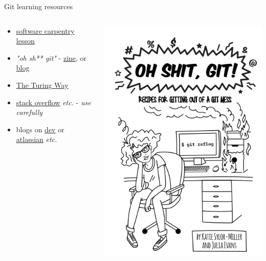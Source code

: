 \documentclass{beamer} %
\begin{document}
  \begin{frame}{Git learning resources}
    \begin{columns}
      \begin{column}{0.5\textwidth}
        \begin{itemize}
          \item \href{http://swcarpentry.github.io/git-novice/}{\underline{software carpentry lesson}}
          \item \textit{"oh sh** git"} - \href{https://wizardzines.com/zines/oh-shit-git/}{\underline{zine}}, or \href{https://ohshitgit.com/}{\underline{blog}}
          \item \href{https://the-turing-way.netlify.app/reproducible-research/vcs.html}{\underline{The Turing Way}}
          \item \href{https://stackoverflow.com/}{\underline{stack overflow}} \textit{etc.} - \textit{use carefully}
          \item blogs on \href{https://dev.to/}{\underline{dev}} or \href{https://www.atlassian.com/git/tutorials}{\underline{atlassian}} \textit{etc.}
        \end{itemize}
      \end{column}
      \begin{column}{0.5\textwidth}
        \includegraphics[height=0.8\textheight]{ohshitgit.png}
      \end{column}
    \end{columns}
  \end{frame}
\end{document}
